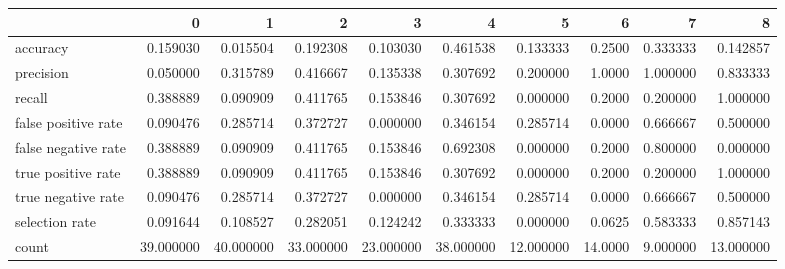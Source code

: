 \begin{tabular}{lrrrrrrrrr}
\toprule
{} &          0 &          1 &          2 &          3 &          4 &          5 &        6 &         7 &          8 \\
\midrule
accuracy            &   0.159030 &   0.015504 &   0.192308 &   0.103030 &   0.461538 &   0.133333 &   0.2500 &  0.333333 &   0.142857 \\
precision           &   0.050000 &   0.315789 &   0.416667 &   0.135338 &   0.307692 &   0.200000 &   1.0000 &  1.000000 &   0.833333 \\
recall              &   0.388889 &   0.090909 &   0.411765 &   0.153846 &   0.307692 &   0.000000 &   0.2000 &  0.200000 &   1.000000 \\
false positive rate &   0.090476 &   0.285714 &   0.372727 &   0.000000 &   0.346154 &   0.285714 &   0.0000 &  0.666667 &   0.500000 \\
false negative rate &   0.388889 &   0.090909 &   0.411765 &   0.153846 &   0.692308 &   0.000000 &   0.2000 &  0.800000 &   0.000000 \\
true positive rate  &   0.388889 &   0.090909 &   0.411765 &   0.153846 &   0.307692 &   0.000000 &   0.2000 &  0.200000 &   1.000000 \\
true negative rate  &   0.090476 &   0.285714 &   0.372727 &   0.000000 &   0.346154 &   0.285714 &   0.0000 &  0.666667 &   0.500000 \\
selection rate      &   0.091644 &   0.108527 &   0.282051 &   0.124242 &   0.333333 &   0.000000 &   0.0625 &  0.583333 &   0.857143 \\
count               &  39.000000 &  40.000000 &  33.000000 &  23.000000 &  38.000000 &  12.000000 &  14.0000 &  9.000000 &  13.000000 \\
\bottomrule
\end{tabular}
